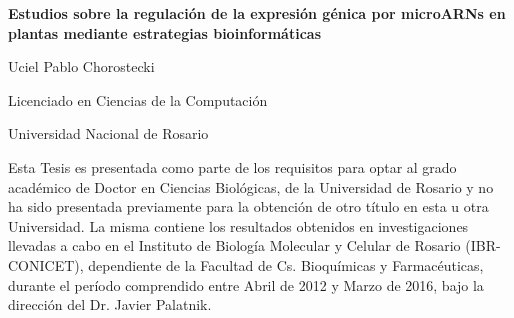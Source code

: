 
\begin{declaration}

\begin{center}

{\Large \bfseries{Estudios sobre la regulación de la expresión génica por microARNs en plantas mediante estrategias bioinformáticas}} 
\vspace*{10em}

{\Large Uciel Pablo Chorostecki \par} 
\vspace*{1em}
{\Large Licenciado en Ciencias de la Computación \par} 
\vspace*{1em}
{\Large Universidad Nacional de Rosario\par} 
\vspace*{6em}

\end{center}


Esta Tesis es presentada como parte de los requisitos para optar al grado académico de Doctor en Ciencias Biológicas, 
 de la Universidad de Rosario y no ha sido presentada previamente para la obtención de otro título en esta u otra Universidad. 
 La misma contiene los resultados obtenidos en investigaciones llevadas a cabo en el Instituto de Biología Molecular y Celular de Rosario (IBR-CONICET),
 dependiente de la Facultad de Cs. Bioquímicas y Farmacéuticas, durante el período comprendido entre Abril de 2012 y Marzo de 2016, 
 bajo la dirección del Dr. Javier Palatnik.



\end{declaration}

